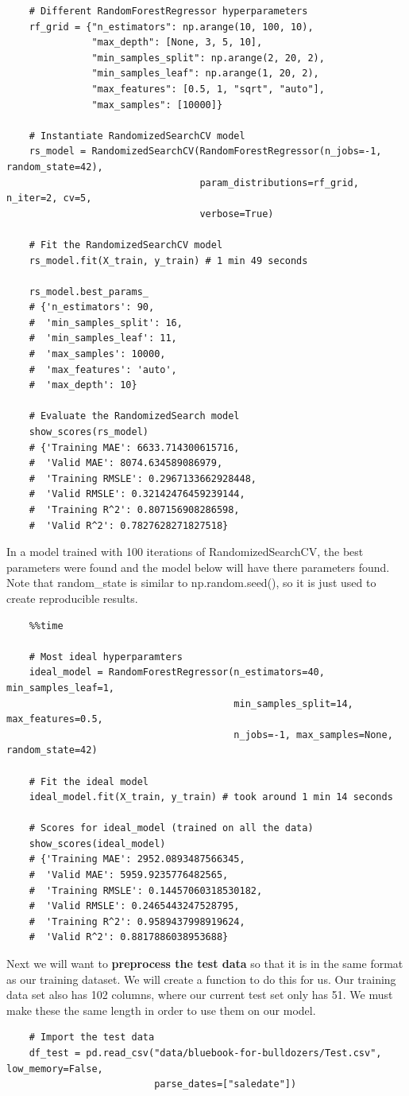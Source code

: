 \documentclass[11pt, a4paper]{article}
\begin{document}
\begin{spacing}{1.1}
\begin{lstlisting}
	# Different RandomForestRegressor hyperparameters
	rf_grid = {"n_estimators": np.arange(10, 100, 10),
	           "max_depth": [None, 3, 5, 10],
	           "min_samples_split": np.arange(2, 20, 2),
	           "min_samples_leaf": np.arange(1, 20, 2),
	           "max_features": [0.5, 1, "sqrt", "auto"],
	           "max_samples": [10000]}
	
	# Instantiate RandomizedSearchCV model
	rs_model = RandomizedSearchCV(RandomForestRegressor(n_jobs=-1, random_state=42),
	                              param_distributions=rf_grid, n_iter=2, cv=5, 
	                              verbose=True)
	
	# Fit the RandomizedSearchCV model
	rs_model.fit(X_train, y_train) # 1 min 49 seconds
	
	rs_model.best_params_
	# {'n_estimators': 90,
	#  'min_samples_split': 16,
	#  'min_samples_leaf': 11,
	#  'max_samples': 10000,
	#  'max_features': 'auto',
	#  'max_depth': 10}	
	
	# Evaluate the RandomizedSearch model
	show_scores(rs_model)
	# {'Training MAE': 6633.714300615716,
	#  'Valid MAE': 8074.634589086979,
	#  'Training RMSLE': 0.2967133662928448,
	#  'Valid RMSLE': 0.32142476459239144,
	#  'Training R^2': 0.807156908286598,
	#  'Valid R^2': 0.7827628271827518}	\end{lstlisting} \newpage

	\noindent In a model trained with 100 iterations of RandomizedSearchCV, the best parameters were found and the model below will have there parameters found. Note that random\_state is similar to np.random.seed(), so it is just used to create reproducible results.
	\begin{lstlisting}
	%%time
	
	# Most ideal hyperparamters
	ideal_model = RandomForestRegressor(n_estimators=40, min_samples_leaf=1,
	                                    min_samples_split=14, max_features=0.5,
	                                    n_jobs=-1, max_samples=None, random_state=42)
	
	# Fit the ideal model
	ideal_model.fit(X_train, y_train) # took around 1 min 14 seconds
	
	# Scores for ideal_model (trained on all the data)
	show_scores(ideal_model)
	# {'Training MAE': 2952.0893487566345,
	#  'Valid MAE': 5959.9235776482565,
	#  'Training RMSLE': 0.14457060318530182,
	#  'Valid RMSLE': 0.2465443247528795,
	#  'Training R^2': 0.9589437998919624,
	#  'Valid R^2': 0.8817886038953688}	\end{lstlisting} \vspace*{1mm}
	Next we will want to \textbf{preprocess the test data} so that it is in the same format as our training dataset. We will create a function to do this for us. Our training data set also has 102 columns, where our current test set only has 51. We must make these the same length in order to use them on our model.
	\begin{lstlisting}
	# Import the test data
	df_test = pd.read_csv("data/bluebook-for-bulldozers/Test.csv", low_memory=False,
	                      parse_dates=["saledate"])
	                   

\end{lstlisting}
\end{spacing}
\end{document}
